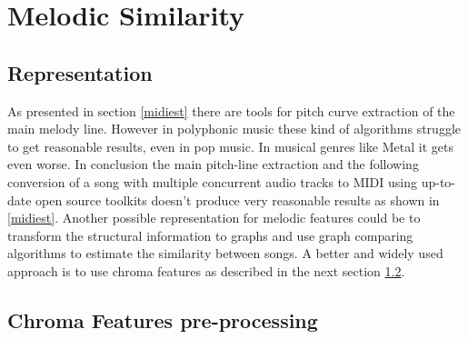 \newpage

\section{Melodic Similarity}\label{melsimc}

\subsection{Representation}

As presented in section \ref{midiest} there are tools for pitch curve extraction of the main melody line. However in polyphonic music these kind of algorithms struggle to get reasonable results, even in pop music. In musical genres like Metal it gets even worse. In conclusion the main pitch-line extraction and the following conversion of a song with multiple concurrent audio tracks to MIDI using up-to-date open source toolkits doesn't produce very reasonable results as shown in \ref{midiest}.
Another possible representation for melodic features could be to transform the structural information to graphs and use graph comparing algorithms to estimate the similarity between songs. \cite{graph1} 
A better and widely used approach is to use chroma features as described in the next section \ref{chromafeat}.

\subsection{Chroma Features pre-processing}\label{chromafeat}

